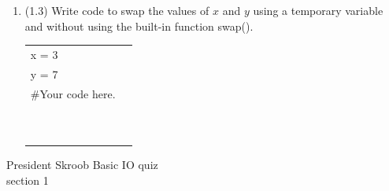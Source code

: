 \documentclass{article}
\begin{document}
\begin{enumerate}
\item (1.3) 
		Write code to swap the values of $x$ and $y$ using a temporary variable and without using
		the built-in function swap().\\		
		\begin{tabular}{|ll}
			\\			
			x = 3\\
			y = 7\\[5pt]
			\#Your code here. \\[5pt]
			& \\ & \\ & \\ & \\ & \\ & \\ & \\ & \\ & \\ & \\ 
		\end{tabular}



\end{enumerate}
\pagebreak
President Skroob \hfill Basic IO quiz\\
section 1\\
\end{document}
